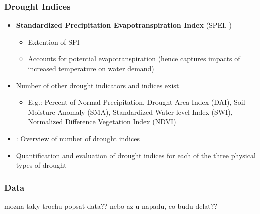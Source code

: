 \documentclass{beamer}              %
\begin{document}
\begin{frame}\label{Indices3}
\frametitle{Drought Indices} 

 \begin{itemize}
 \item \textbf{Standardized Precipitation Evapotranspiration Index} (SPEI, \citealp{SPEI})
\begin{itemize}
\item Extention of SPI
\item Accounts for potential evapotranspiration (hence captures impacts of increased temperature on water demand)
\end{itemize}
\item Number of other drought indicators and indices exist
\begin{itemize}
\item E.g.: Percent of Normal Precipitation, Drought Area Index (DAI), Soil Moisture Anomaly (SMA), Standardized Water-level Index (SWI), Normalized Difference Vegetation Index (NDVI)
\end{itemize}
\item  \citealp{monacelli2005, svoboda2016, zargar2011}: Overview of number of drought indices

\item Quantification and evaluation of drought indices for each of the three physical types of drought \citep{keyantash2002}
\end{itemize} 


\end{frame}










\begin{frame}

\frametitle{Data}\label{data} 

mozna taky trochu popsat data?? nebo az u napadu, co budu delat??

\end{frame}
\end{document}
